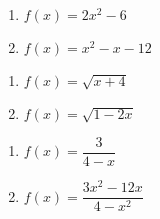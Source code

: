 \begin{multicols}{2}
\begin{enumerate}
\setcounter{enumi}{\value{HW}}

\item $f(x) = 2x^2 - 6$
\item $f(x) = x^2 - x - 12$

\setcounter{HW}{\value{enumi}}
\end{enumerate}
\end{multicols}

\begin{multicols}{2}
\begin{enumerate}
\setcounter{enumi}{\value{HW}}

\item $f(x) = \sqrt{x+4}$
\item $f(x) = \sqrt{1-2x}$

\setcounter{HW}{\value{enumi}}
\end{enumerate}
\end{multicols}

\begin{multicols}{2}
\begin{enumerate}
\setcounter{enumi}{\value{HW}}

\item $f(x) = \dfrac{3}{4-x}$
\item $f(x) = \dfrac{3x^2-12x}{4-x^2}$ \label{findzerofunclast}

\setcounter{HW}{\value{enumi}}
\end{enumerate}
\end{multicols}

